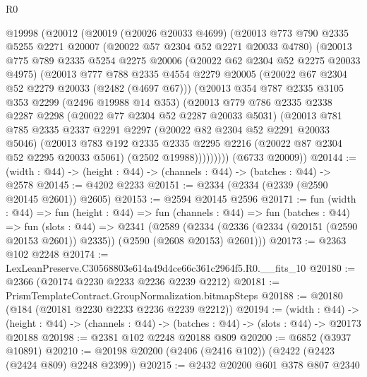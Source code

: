 \begin{lexlean}{R0}
\begin{coremodule}
  @19998
    (@20012
      (@20019
        (@20026 @20033 @4699)
        (@20013
          @773
          @790
          @2335
          @5255
          @2271
          @20007
          (@20022 @57 @2304 @52 @2271 @20033 @4780)
          (@20013
            @775
            @789
            @2335
            @5254
            @2275
            @20006
            (@20022 @62 @2304 @52 @2275 @20033 @4975)
            (@20013
              @777
              @788
              @2335
              @4554
              @2279
              @20005
              (@20022 @67 @2304 @52 @2279 @20033 (@2482 (@4697 @67)))
              (@20013
                @354
                @787
                @2335
                @3105
                @353
                @2299
                (@2496 @19988 @14 @353)
                (@20013
                  @779
                  @786
                  @2335
                  @2338
                  @2287
                  @2298
                  (@20022 @77 @2304 @52 @2287 @20033 @5031)
                  (@20013
                    @781
                    @785
                    @2335
                    @2337
                    @2291
                    @2297
                    (@20022 @82 @2304 @52 @2291 @20033 @5046)
                    (@20013
                      @783
                      @192
                      @2335
                      @2335
                      @2295
                      @2216
                      (@20022 @87 @2304 @52 @2295 @20033 @5061)
                      (@2502 @19988)))))))))
      (@6733 @20009))
@20144 := (width : @44) -> (height : @44) -> (channels : @44) -> (batches : @44) -> @2578
@20145 := @4202 @2233
@20151 := @2334 (@2334 (@2339 (@2590 @20145 @2601)) @2605)
@20153 := @2594 @20145 @2596
@20171 := fun (width : @44) =>
  fun (height : @44) =>
  fun (channels : @44) =>
  fun (batches : @44) =>
  fun (slots : @44) =>
  @2341
    (@2589 (@2334 (@2336 (@2334 (@20151 (@2590 @20153 @2601)) @2335)) (@2590 (@2608 @20153) @2601)))
@20173 := @2363 @102 @2248
@20174 := LexLeanPreserve.C30568803e614a49d4ce66c361c2964f5.R0.__fits_10
@20180 := @2366 (@20174 @2230 @2233 @2236 @2239 @2212)
@20181 := PrismTemplateContract.GroupNormalization.bitmapSteps
@20188 := @20180 (@184 (@20181 @2230 @2233 @2236 @2239 @2212))
@20194 := (width : @44) ->
  (height : @44) -> (channels : @44) -> (batches : @44) -> (slots : @44) -> @20173 @20188
@20198 := @2381 @102 @2248 @20188 @809
@20200 := @6852 (@3937 @10891)
@20210 := @20198 @20200 (@2406 (@2416 @102)) (@2422 (@2423 (@2424 @809) @2248 @2399))
@20215 := @2432 @20200 @601 @378 @807 @2340

\end{coremodule}
\end{lexlean}
